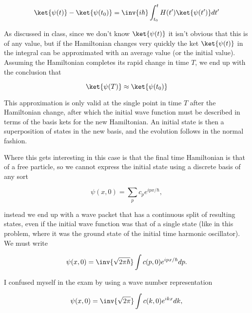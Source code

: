 \begin{equation}\label{eqn:qmTwoExamReflection:30}
\ket{\psi(t)} - \ket{\psi(t_0)} = \inv{i\hbar} \int_{t_0}^t H(t') \ket{\psi(t')} dt'
\end{equation}

As discussed in class, since we don't know $\ket{\psi(t)}$ it isn't obvious that this is of any value, but if the Hamiltonian changes very quickly the ket $\ket{\psi(t)}$ in the integral can be approximated with an average value (or the initial value).  Assuming the Hamiltonian completes its rapid change in time $T$, we end up with the conclusion that

\begin{equation}\label{eqn:qmTwoExamReflection:50}
\ket{\psi(T)} \approx \ket{\psi(t_0)}
\end{equation}

This approximation is only valid at the single point in time $T$ after the Hamiltonian change, after which the initial wave function must be described in terms of the basis kets for the new Hamiltonian.  An initial state is then a superposition of states in the new basis, and the evolution follows in the normal fashion.

Where this gets interesting in this case is that the final time Hamiltonian is that of a free particle, so we cannot express the initial state using a discrete basis of any sort

\begin{equation}\label{eqn:qmTwoExamReflection:70}
\psi(x, 0) = \sum_p c_p e^{i p x/\hbar},
\end{equation}

instead we end up with a wave packet that has a continuous split of resulting states, even if the initial wave function was that of a single state (like in this problem, where it was the ground state of the initial time harmonic oscillator).  We must write

\begin{equation}\label{eqn:qmTwoExamReflection:90}
\psi(x, 0) = \inv{\sqrt{2 \pi \hbar}} \int c(p, 0) e^{i p x/\hbar} dp.
\end{equation}

I confused myself in the exam by using a wave number representation

\begin{equation}\label{eqn:qmTwoExamReflection:110}
\psi(x, 0) = \inv{\sqrt{2 \pi}} \int c(k, 0) e^{i k x} dk,
\end{equation}

